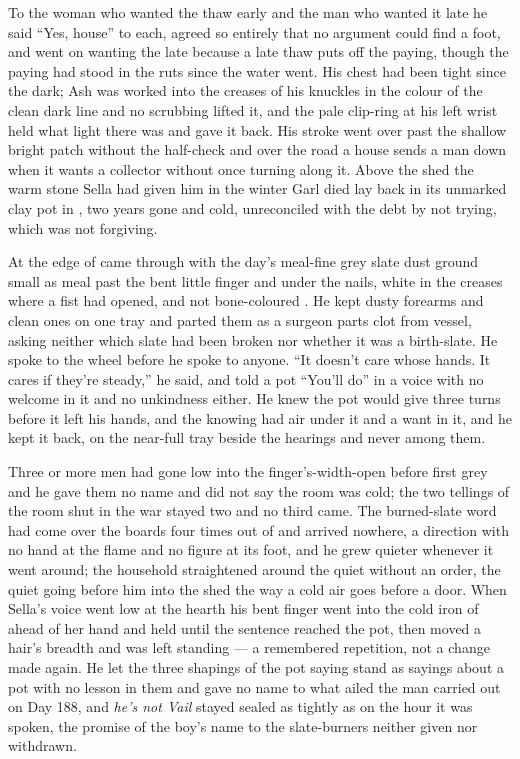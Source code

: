To the woman who wanted the thaw early and the man who wanted it late he said “Yes, house” to each, agreed so entirely that no argument could find a foot, and went on wanting the late because a late thaw puts off the paying, though the paying had stood in the ruts since the water went. His chest had been tight since the dark; Ash was worked into the creases of his knuckles in the colour of the clean dark line and no scrubbing lifted it, and the pale clip-ring at his left wrist held what light there was and gave it back. His stroke went over  past the shallow bright patch without the half-check and over the road a house sends a man down when it wants a collector without once turning along it. Above the shed the warm stone Sella had given him in the winter Garl died lay back in its unmarked clay pot in , two years gone and cold, unreconciled with the debt by not trying, which was not forgiving.

At the edge of   came through with the day's meal-fine grey slate dust ground small as meal past the bent little finger and under the nails, white in the creases where a fist had opened, and not bone-coloured . He kept dusty forearms and clean ones on one tray and parted them as a surgeon parts clot from vessel, asking neither which slate had been broken nor whether it was a birth-slate. He spoke to the wheel before he spoke to anyone. “It doesn't care whose hands. It cares if they're steady,” he said, and told a pot “You'll do” in a voice with no welcome in it and no unkindness either. He knew  the pot would give three turns before it left his hands, and the knowing had air under it and a want in it, and he kept it back, on the near-full tray beside the hearings and never among them.

Three or more men had gone low into the finger's-width-open  before first grey and he gave them no name and did not say the room was cold; the two tellings of the room shut in the war stayed two and no third came. The burned-slate word had come over the boards four times out of  and arrived nowhere, a direction with no hand at the flame and no figure at its foot, and he grew quieter whenever it went around; the household straightened around the quiet without an order, the quiet going before him into the shed the way a cold air goes before a door. When Sella's voice went low at the hearth his bent finger went into the cold iron of  ahead of her hand and held until the sentence reached the pot, then moved a hair's breadth and was left standing --- a remembered repetition, not a change made again. He let the three shapings of the pot saying stand as sayings about a pot with no lesson in them and gave no name to what ailed the man carried out on Day 188, and \emph{he's not Vail} stayed sealed as tightly as on the hour it was spoken, the promise of the boy's name to the slate-burners neither given nor withdrawn.

